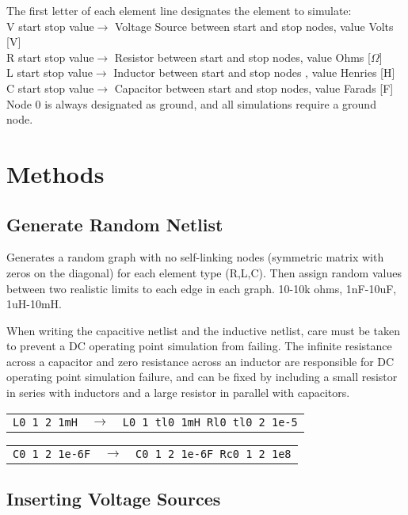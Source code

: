 \documentclass[11pt,twoside]{mitthesis}
\begin{document}
The first letter of each element line designates the element to simulate: \\
V start stop value$\rightarrow$ Voltage Source between start and stop nodes, value Volts [V]\\
R start stop value$\rightarrow$ Resistor between start and stop nodes, value Ohms [$\Omega$]\\
L start stop value$\rightarrow$ Inductor between start and stop nodes , value Henries [H]\\
C start stop value$\rightarrow$ Capacitor between start and stop nodes, value Farads [F]\\

Node 0 is always designated as ground, and all simulations require a ground node.


\section{Methods}
\subsection{Generate Random Netlist}
Generates a random graph with no self-linking nodes (symmetric matrix with zeros on the diagonal) for each element type (R,L,C).
Then assign random values between two realistic limits to each edge in each graph.
10-10k ohms, 1nF-10uF, 1uH-10mH.

When writing the capacitive netlist and the inductive netlist, care must be taken to prevent a DC operating point simulation from failing.
The infinite resistance across a capacitor and zero resistance across an inductor are responsible for DC operating point simulation failure, and can be fixed by including a small resistor in series with inductors and a large resistor in parallel with capacitors. 

\begin{tabular}{ c c  p{3cm} }
\texttt{L0 1 2 1mH} & $\rightarrow$ & \texttt{L0 1 tl0 1mH Rl0 tl0 2 1e-5} \\
\end{tabular}
\begin{tabular}{ |c  c  p{3cm} }
\texttt{C0 1 2 1e-6F} & $\rightarrow$ & \texttt{C0 1 2 1e-6F Rc0 1 2 1e8} \\
\end{tabular}

\subsection{Inserting Voltage Sources}
\end{document}

